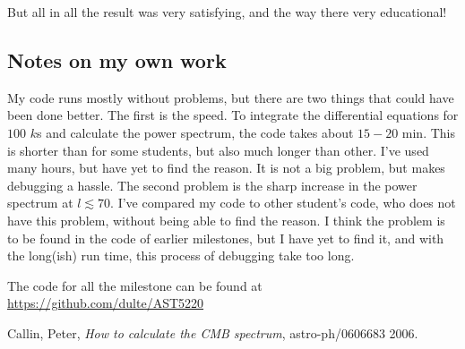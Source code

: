 \documentclass[a4paper,norsk, 10pt]{article}
\begin{document}
But all in all the result was very satisfying, and the way there very educational!


\subsection{Notes on my own work}
My code runs mostly without problems, but there are two things that could have been done better. The first is the speed. To integrate the differential equations for $100$ $k$s and calculate the power spectrum, the code takes about $15-20$ min. This is shorter than for some students, but also much longer than other. I've used many hours, but have yet to find the reason. It is not a big problem, but makes debugging a hassle. The second problem is the sharp increase in the power spectrum at $l\lesssim 70$. I've compared my code to other student's code, who does not have this problem, without being able to find the reason. I think the problem is to be found in the code of earlier milestones, but I have yet to find it, and with the long(ish) run time, this process of debugging take too long.

The code for all the milestone can be found at \url{https://github.com/dulte/AST5220}

\begin{thebibliography}{9}

  Callin, Peter,
  \textit{How to calculate the CMB spectrum},
  astro-ph/0606683
  2006.

\end{thebibliography}
\end{document}
